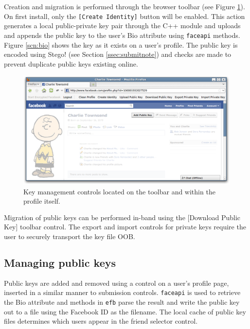 Creation and migration is performed through the browser toolbar (see Figure \ref{scn:pubkey}). On first install, only the {\tt [Create Identity]} button will be enabled. This action generates a local public-private key pair through the C++ module and uploads and appends the public key to the user's Bio attribute using {\tt faceapi} methods. Figure \ref{scn:bio} shows the key as it exists on a user's profile. The public key is encoded using Stego! (see Section \ref{ssec:submitnote}) and checks are made to prevent duplicate public keys existing online.

    \begin{figure}[tbph]
        \begin{center}
        
                \includegraphics[width=12cm]{screens/pubkey.png}

            \caption{Key management controls located on the toolbar and within the profile itself.}
            \label{scn:pubkey}
        \end{center}
    \end{figure}

Migration of public keys can be performed in-band using the [Download Public Key] toolbar control. The export and import controls for private keys require the user to securely transport the key file OOB.

    
\subsection{Managing public keys}
\label{ssec:mankeys}

Public keys are added and removed using a control on a user's profile page, inserted in a similar manner to submission controls. {\tt faceapi} is used to retrieve the Bio attribute and methods in {\tt efb} parse the result and write the public key out to a file using the Facebook ID as the filename. The local cache of public key files determines which users appear in the friend selector control.
    
